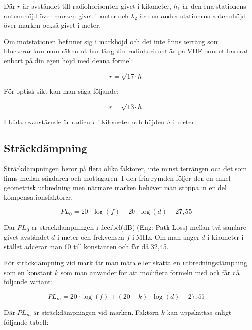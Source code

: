Där $r$ är avståndet till radiohorisonten givet i kilometer, $h_1$ är den ena
stationens antennhöjd över marken givet i meter och $h_2$ är den andra
stationens antennhöjd över marken också givet i meter.

Om motstationen befinner sig i markhöjd och det inte finns terräng som
blockerar kan man räkna ut hur lång din radiohorisont är på VHF-bandet baserat
enbart på din egen höjd med denna formel:

\begin{equation}
	r = \sqrt{17 \cdot h}
\end{equation}

För optisk sikt kan man säga följande:

\begin{equation}
	r = \sqrt{13 \cdot h}
\end{equation}

I båda ovanstående är radien $r$ i kilometer och höjden $h$ i meter.


\subsection{Sträckdämpning}

Sträckdämpningen beror på flera olika faktorer, inte minst terrängen och det
som finns mellan sändaren och mottagaren. I den fria rymden följer den en
enkel geometrisk utbredning men närmare marken behöver man stoppa in en del
kompensationsfaktorer.

\begin{equation}
	PL_0 = 20 \cdot \log(f) + 20 \cdot \log(d) - 27,55
\end{equation}

Där $PL_{0}$ är sträckdämpningen i decibel(dB) (Eng: Path Loss) mellan två
sändare givet avståndet $d$ i meter och frekvensen $f$ i MHz. Om man anger $d$
i kilometer i stället adderar man 60 till konstanten och får då 32,45.

För sträckdämpning vid mark får man mäta eller skatta en utbredningsdämpning
som en konstant $k$ som man använder för att modifiera formeln med och får då
följande variant:


\begin{equation}
	PL_m = 20 \cdot \log(f) + (20+k) \cdot \log(d) - 27,55
\end{equation}

Där $PL_m$ är sträckdämpningen vid marken. Faktorn $k$ kan uppskattas enligt
följande tabell:

